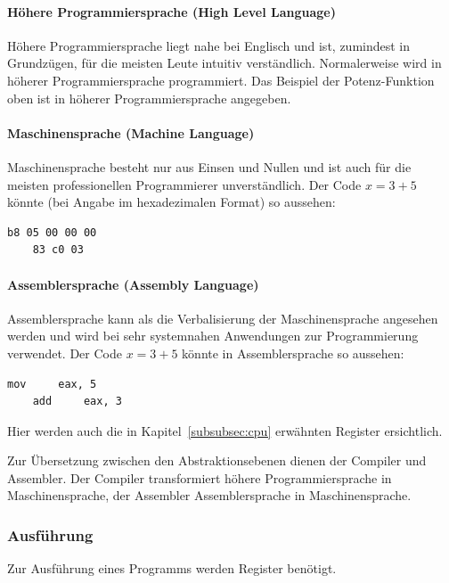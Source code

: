 \documentclass[11pt, a4paper]{article}
\begin{document}
\paragraph{Höhere Programmiersprache (High Level Language)}
Höhere Programmiersprache liegt nahe bei Englisch und ist, zumindest in Grundzügen, für die meisten Leute intuitiv verständlich. Normalerweise wird in höherer Programmiersprache programmiert. Das Beispiel der Potenz-Funktion oben ist in höherer Programmiersprache angegeben.
\paragraph{Maschinensprache (Machine Language)}
Maschinensprache besteht nur aus Einsen und Nullen und ist auch für die meisten professionellen Programmierer unverständlich. Der Code \(x = 3 + 5\) könnte (bei Angabe im hexadezimalen Format) so aussehen: 
\begin{lstlisting}[style=LowLevelStyle]
	b8 05 00 00 00
	83 c0 03 
\end{lstlisting}
\paragraph{Assemblersprache (Assembly Language)}
Assemblersprache kann als die Verbalisierung der Maschinensprache angesehen werden und wird bei sehr systemnahen Anwendungen zur Programmierung verwendet. Der Code \(x = 3 + 5\) könnte in Assemblersprache so aussehen: 
\begin{lstlisting}[style=LowLevelStyle]
	mov 	eax, 5
	add 	eax, 3
\end{lstlisting}

Hier werden auch die in Kapitel~\ref{subsubsec:cpu} erwähnten Register ersichtlich.

Zur Übersetzung zwischen den Abstraktionsebenen dienen der Compiler und Assembler. Der Compiler transformiert höhere Programmiersprache in Maschinensprache, der Assembler Assemblersprache in Maschinensprache.

\subsubsection{Ausführung}
Zur Ausführung eines Programms werden Register benötigt.
\end{document}
